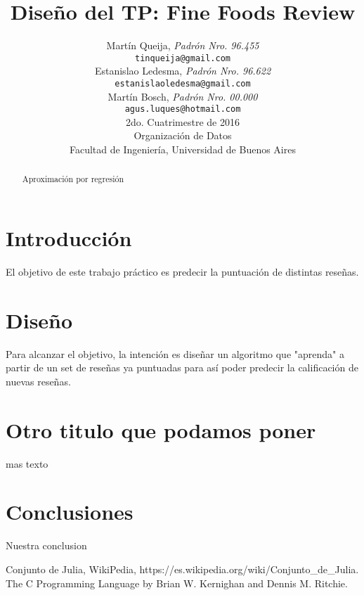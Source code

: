 \documentclass[a4paper,10pt]{article}
\title{		\textbf{Diseño del TP: Fine Foods Review}}
\author{	Martín Queija, \textit{Padrón Nro. 96.455}                     \\
            \texttt{ tinqueija@gmail.com }                                              \\[2.5ex]
            Estanislao Ledesma, \textit{Padrón Nro. 96.622}                     \\
            \texttt{ estanislaoledesma@gmail.com }                                              \\[2.5ex]
            Martín Bosch, \textit{Padrón Nro. 00.000}                     \\
            \texttt{ agus.luques@hotmail.com }                                              \\[2.5ex]
            \normalsize{2do. Cuatrimestre de 2016}                                      \\
            \normalsize{Organización de Datos  }  \\
            \normalsize{Facultad de Ingeniería, Universidad de Buenos Aires}            \\
       }
\date{}
\begin{document}
\maketitle
\thispagestyle{empty}   %


\begin{abstract}
\centerline{Aproximación por regresión}

\end{abstract}
\newpage

\tableofcontents


\section{Introducción}

El objetivo de este trabajo práctico es predecir la puntuación de distintas reseñas.

\section{Diseño}

Para alcanzar el objetivo, la intención es diseñar un algoritmo que "aprenda" a partir de un set de reseñas ya puntuadas para así poder predecir la calificación de nuevas reseñas.

\section{Otro titulo que podamos poner}

mas texto

\section{Conclusiones}

Nuestra conclusion

\begin{thebibliography}{99}

 Conjunto de Julia, WikiPedia, https://es.wikipedia.org/wiki/Conjunto\_de\_Julia.
 The C Programming Language by Brian W. Kernighan and Dennis M. Ritchie.

\end{thebibliography}
\end{document}
